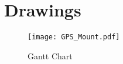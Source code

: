 \chapter{Drawings} \label{App:Drawings}

\begin{figure}[H]
\centerline{\texttt{[image: GPS\_Mount.pdf]}}
\caption[]{Gantt Chart}
\label{fig:Gantt}
\end{figure}
